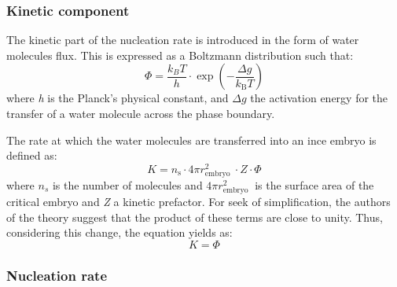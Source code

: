 \subsubsection*{Kinetic component}

\setlength{\parindent}{0.5cm} The kinetic part of the nucleation rate is introduced in the form of water molecules flux. This is expressed as a Boltzmann distribution such that:
\begin{equation}
	\label{2.23}
	\Phi=\frac{k_{B} T}{h} \cdot \exp \left(-\frac{\Delta g}{k_{\mathrm{B}} T}\right)
\end{equation}
where \textit{h} is the Planck's physical constant, and $\Delta g$ the activation energy for the transfer of a water molecule across the phase boundary.

\noindent The rate at which the water molecules are transferred into an ince embryo is defined as:
\begin{equation}
	\label{2.24}
	K=n_{\mathrm{s}} \cdot 4 \pi r_{\text {embryo }}^{2} \cdot Z \cdot \Phi
\end{equation}
where $n_s$ is the number of molecules and $4 \pi r_{\text {embryo }}^{2}$ is the surface area of the critical embryo and \textit{Z} a kinetic prefactor. For seek of simplification, the authors of the theory suggest that the product of these terms are close to unity. Thus, considering this change, the equation yields as:
\begin{equation}
	\label{2.25}
	K=\Phi
\end{equation}

\subsubsection*{Nucleation rate}

